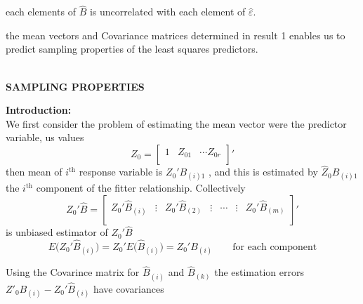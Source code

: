 \documentclass[11pt,a4paper]{article}
\theoremstyle{definition}
\begin{document}
each elements of $\widehat{B}$ is uncorrelated with each element of $\widehat{\varepsilon}$.



\begin{figure}[H]
\centering
{}
\end{figure}











the mean vectors and Covariance matrices determined in result 1 enables us to predict sampling properties of the least squares predictors.\\\\






\begin{center}
\textbf{SAMPLING PROPERTIES}
\end{center}
\textbf{Introduction:}\\
We first consider the problem of estimating the mean vector were the predictor variable, us values
$$Z_0 =
\begin{bmatrix}
1 & Z_{01} & \cdots Z_{0r}\\
\end{bmatrix}'
$$ 
then mean of $i^{\text{th}}$ response variable is $Z_0'B_{(i)1}$ , and this is estimated by $\widehat{Z}_0B_{(i)1}$  the $i^{\text{th}}$ component of the fitter relationship. Collectively
\begin{equation}\tag{11}
Z_0'\widehat{B} =
\begin{bmatrix}
Z_0'\widehat{B}_{(i)} & \vdots & Z_0'\widehat{B}_{(2)} & \vdots & \cdots& \vdots & Z_0'\widehat{B}_{(m)}\\
\end{bmatrix}'
\end{equation}
is unbiased estimator of $Z_0'\widehat{B}$
$$E\big(Z_0'\widehat{B}_{(i)}\big) = Z_0'E\big(\widehat{B}_{(i)}\big) = Z_0'B_{(i)}\qquad\text{for each component}$$


Using the Covarince matrix for $\widehat{B}_{(i)}$ and $\widehat{B}_{(k)}$ the estimation errors $Z'_0B_{(i)}-Z_0'\widehat{B}_{(i)}$ have covariances
\end{document}
